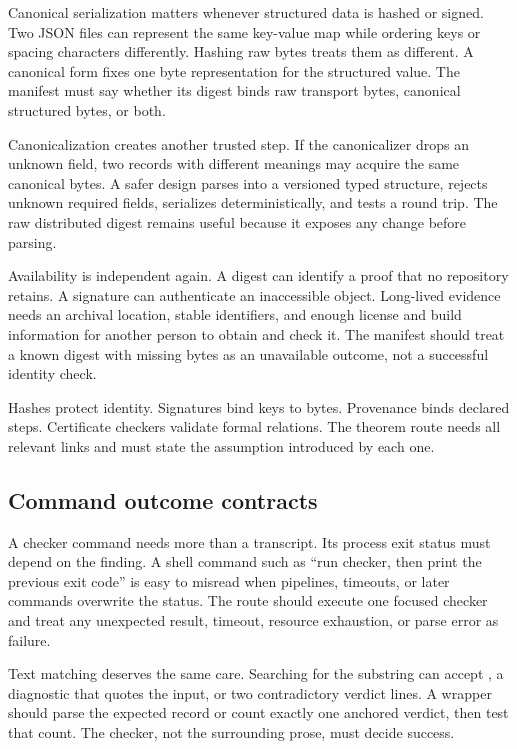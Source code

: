 Canonical serialization matters whenever structured data is hashed or signed.
Two JSON files can represent the same key-value map while ordering keys or
spacing characters differently. Hashing raw bytes treats them as different.
A canonical form fixes one byte representation for the structured value. The
manifest must say whether its digest binds raw transport bytes, canonical
structured bytes, or both.

Canonicalization creates another trusted step. If the canonicalizer drops an
unknown field, two records with different meanings may acquire the same
canonical bytes. A safer design parses into a versioned typed structure,
rejects unknown required fields, serializes deterministically, and tests a
round trip. The raw distributed digest remains useful because it exposes any
change before parsing.

Availability is independent again. A digest can identify a proof that no
repository retains. A signature can authenticate an inaccessible object.
Long-lived evidence needs an archival location, stable identifiers, and enough
license and build information for another person to obtain and check it. The
manifest should treat a known digest with missing bytes as an unavailable
outcome, not a successful identity check.

\begin{archive}[title={Integrity is not truth}]
Hashes protect identity. Signatures bind keys to bytes. Provenance binds
declared steps. Certificate checkers validate formal relations. The theorem
route needs all relevant links and must state the assumption introduced by
each one.
\end{archive}

\subsection{Command outcome contracts}

A checker command needs more than a transcript. Its process exit status must
depend on the finding. A shell command such as ``run checker, then print the
previous exit code'' is easy to misread when pipelines, timeouts, or later
commands overwrite the status. The route should execute one focused checker
and treat any unexpected result, timeout, resource exhaustion, or parse error
as failure.

Text matching deserves the same care. Searching for the substring
 can accept , a diagnostic that quotes the input,
or two contradictory verdict lines. A wrapper should parse the expected
record or count exactly one anchored verdict, then test that count. The
checker, not the surrounding prose, must decide success.

